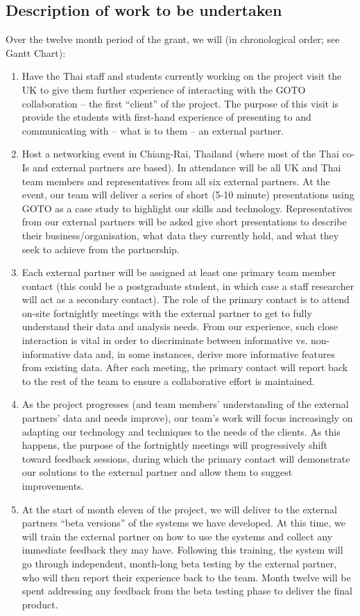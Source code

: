 \documentclass[11pt]{article}
\begin{document}
\subsection{Description of work to be undertaken}
Over the twelve month period of the grant, we will (in chronological order; see Gantt Chart):
\begin{enumerate}[leftmargin=6mm,itemsep=0pt,topsep=1pt]
\item Have the Thai staff and students currently working on the project visit the UK to give them further experience of interacting with the GOTO collaboration -- the first ``client'' of the project. The purpose of this visit is provide the students with first-hand experience of presenting to and communicating with -- what is to them -- an external partner.
\item Host a networking event in Chiang-Rai, Thailand (where most of the Thai co-Is and external partners are based). In attendance will be all UK and Thai team members and representatives from all six external partners. At the event, our team will deliver a series of short (5-10 minute) presentations using GOTO as a case study to highlight our skills and technology. Representatives from our external partners will be asked give short presentations to describe their business/organisation, what data they currently hold, and what they seek to achieve from the partnership.  
\item Each external partner will be assigned at least one primary team member contact (this could be a postgraduate student, in which case a staff researcher will act as a secondary contact). The role of the primary contact is to attend on-site fortnightly meetings with the external partner to get to fully understand their data and analysis needs. From our experience, such close interaction is vital in order to discriminate between informative vs. non-informative data and, in some instances, derive more informative features from existing data. After each meeting, the primary contact will report back to the rest of the team to ensure a collaborative effort is maintained.
\item As the project progresses (and team members' understanding of the external partners' data and needs improve), our team's work will focus increasingly on adapting our technology and techniques to the needs of the clients. As this happens, the purpose of the fortnightly meetings will progressively shift toward feedback sessions, during which the primary contact will demonstrate our solutions to the external partner and allow them to suggest improvements. 
\item At the start of month eleven of the project, we will deliver to the external partners ``beta versions'' of the systems we have developed. At this time, we will train the external partner on how to use the systems and collect any immediate feedback they may have. Following this training, the system will go through independent, month-long beta testing by the external partner, who will then report their experience back to the team. Month twelve will be spent addressing any feedback from the beta testing phase to deliver the final product.
\end{enumerate}
\end{document}
